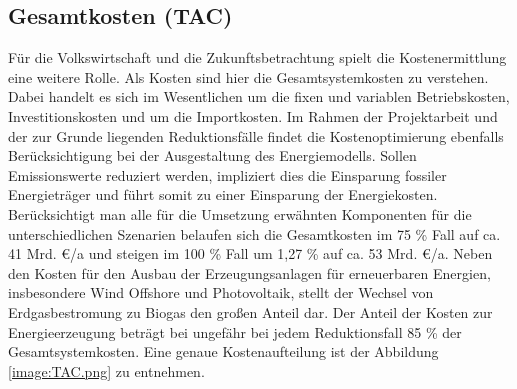 \subsection{Gesamtkosten (TAC)}
Für die Volkswirtschaft und die Zukunftsbetrachtung spielt die Kostenermittlung eine weitere Rolle. Als Kosten sind hier die Gesamtsystemkosten zu verstehen. Dabei handelt es sich im Wesentlichen um die fixen und variablen Betriebskosten, Investitionskosten und um die Importkosten. Im Rahmen der Projektarbeit und der zur Grunde liegenden Reduktionsfälle findet die Kostenoptimierung ebenfalls Berücksichtigung bei der Ausgestaltung des Energiemodells. Sollen Emissionswerte reduziert werden, impliziert dies die Einsparung fossiler Energieträger und führt somit zu einer Einsparung der Energiekosten. Berücksichtigt man alle für die Umsetzung erwähnten Komponenten für die unterschiedlichen Szenarien belaufen sich die Gesamtkosten im 75 \% Fall auf ca. 41 Mrd. €/a und steigen im 100 \% Fall um 1,27 \% auf ca. 53 Mrd. €/a. Neben den Kosten für den Ausbau der Erzeugungsanlagen für erneuerbaren Energien, insbesondere Wind Offshore und Photovoltaik, stellt der Wechsel von Erdgasbestromung zu Biogas den großen Anteil dar. Der Anteil der Kosten zur Energieerzeugung beträgt bei ungefähr bei jedem Reduktionsfall 85 \% der Gesamtsystemkosten. Eine genaue Kostenaufteilung ist der Abbildung \ref{image:TAC.png} zu entnehmen. 

